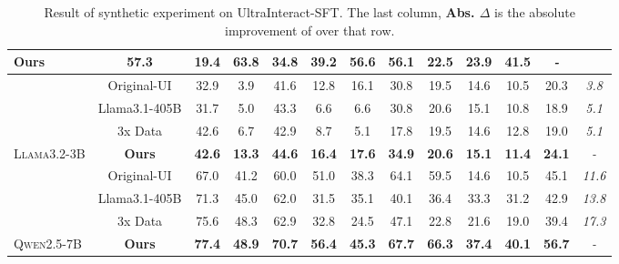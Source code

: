 \begin{table*}[h]
\begin{tabular}{lcccccccccccc}
  \cellcolor[HTML]{F3F4FF}\textbf{Ours} &
  \cellcolor[HTML]{F3F4FF}\textbf{57.3} &
  \cellcolor[HTML]{F3F4FF}\textbf{19.4} &
  \cellcolor[HTML]{F3F4FF}\textbf{63.8} &
  \cellcolor[HTML]{F3F4FF}\textbf{34.8} &
  \cellcolor[HTML]{F3F4FF}\textbf{39.2} &
  \cellcolor[HTML]{F3F4FF}\textbf{56.6} &
  \cellcolor[HTML]{F3F4FF}\textbf{56.1} &
  \cellcolor[HTML]{F3F4FF}\textbf{22.5} &
  \cellcolor[HTML]{F3F4FF}\textbf{23.9} &
  \cellcolor[HTML]{F3F4FF}\textbf{41.5} &
  \textit{-} \\ \hline
 &
  Original-UI &
  32.9 &
  3.9 &
  41.6 &
  12.8 &
  16.1 &
  30.8 &
  19.5 &
  14.6 &
  10.5 &
  20.3 &
  \textit{3.8} \\
 &
  Llama3.1-405B &
  31.7 &
  5.0 &
  43.3 &
  6.6 &
  6.6 &
  30.8 &
  20.6 &
  15.1 &
  10.8 &
  18.9 &
  \textit{5.1} \\
 &
  3x Data &
  42.6 &
  6.7 &
  42.9 &
  8.7 &
  5.1 &
  17.8 &
  19.5 &
  14.6 &
  12.8 &
  19.0 &
  \textit{5.1} \\
\multirow{-4}{*}{\textsc{Llama3.2-3B}} &
  \cellcolor[HTML]{F3F4FF}\textbf{Ours} &
  \cellcolor[HTML]{F3F4FF}\textbf{42.6} &
  \cellcolor[HTML]{F3F4FF}\textbf{13.3} &
  \cellcolor[HTML]{F3F4FF}\textbf{44.6} &
  \cellcolor[HTML]{F3F4FF}\textbf{16.4} &
  \cellcolor[HTML]{F3F4FF}\textbf{17.6} &
  \cellcolor[HTML]{F3F4FF}\textbf{34.9} &
  \cellcolor[HTML]{F3F4FF}\textbf{20.6} &
  \cellcolor[HTML]{F3F4FF}\textbf{15.1} &
  \cellcolor[HTML]{F3F4FF}\textbf{11.4} &
  \cellcolor[HTML]{F3F4FF}\textbf{24.1} &
  \textit{-} \\ \hline
 &
  Original-UI &
  67.0 &
  41.2 &
  60.0 &
  51.0 &
  38.3 &
  64.1 &
  59.5 &
  14.6 &
  10.5 &
  45.1 &
  \textit{11.6} \\
 &
  Llama3.1-405B &
  71.3 &
  45.0 &
  62.0 &
  31.5 &
  35.1 &
  40.1 &
  36.4 &
  33.3 &
  31.2 &
  42.9 &
  \textit{13.8} \\
 &
  3x Data &
  75.6 &
  48.3 &
  62.9 &
  32.8 &
  24.5 &
  47.1 &
  22.8 &
  21.6 &
  19.0 &
  39.4 &
  \textit{17.3} \\
\multirow{-4}{*}{\textsc{Qwen2.5-7B}} &
  \cellcolor[HTML]{F3F4FF}\textbf{Ours} &
  \cellcolor[HTML]{F3F4FF}\textbf{77.4} &
  \cellcolor[HTML]{F3F4FF}\textbf{48.9} &
  \cellcolor[HTML]{F3F4FF}\textbf{70.7} &
  \cellcolor[HTML]{F3F4FF}\textbf{56.4} &
  \cellcolor[HTML]{F3F4FF}\textbf{45.3} &
  \cellcolor[HTML]{F3F4FF}\textbf{67.7} &
  \cellcolor[HTML]{F3F4FF}\textbf{66.3} &
  \cellcolor[HTML]{F3F4FF}\textbf{37.4} &
  \cellcolor[HTML]{F3F4FF}\textbf{40.1} &
  \cellcolor[HTML]{F3F4FF}\textbf{56.7} &
  \textit{-} \\ \hline

\end{tabular}
\caption{Result of synthetic experiment on UltraInteract-SFT. The last column, \textbf{Abs. $\Delta$} is the absolute improvement of \name over that row.}
\label{tab:main}
\end{table*}